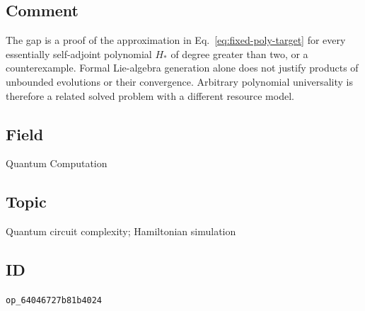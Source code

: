 \subsection*{Comment}

The gap is a proof of the approximation in Eq.~\eqref{eq:fixed-poly-target} for every essentially self-adjoint polynomial $H_*$ of degree greater than two, or a counterexample.
Formal Lie-algebra generation alone does not justify products of unbounded evolutions or their convergence.
Arbitrary polynomial universality is therefore a related solved problem with a different resource model.

\subsection*{Field}

Quantum Computation

\subsection*{Topic}

Quantum circuit complexity; Hamiltonian simulation

\subsection*{ID}

\texttt{op\_64046727b81b4024}
